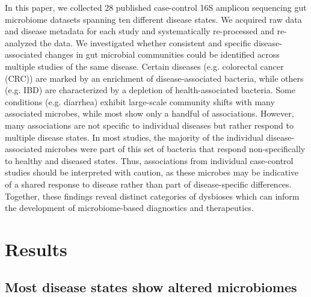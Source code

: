 In this paper, we collected 28 published case-control 16S amplicon sequencing gut microbiome datasets spanning ten different disease states.
We acquired raw data and disease metadata for each study and systematically re-processed and re-analyzed the data.
We investigated whether consistent and specific disease-associated changes in gut microbial communities could be identified across multiple studies of the same disease.
Certain diseases (e.g. colorectal cancer (CRC)) are marked by an enrichment of disease-associated bacteria, while others (e.g. IBD) are characterized by a depletion of health-associated bacteria.
Some conditions (e.g. diarrhea) exhibit large-scale community shifts with many associated microbes, while most show only a handful of associations.
However, many associations are not specific to individual diseases but rather respond to multiple disease states.
In most studies, the majority of the individual disease-associated microbes were part of this set of bacteria that respond non-specifically to healthy and diseased states.
Thus, associations from individual case-control studies should be interpreted with caution, as these microbes may be indicative of a shared response to disease rather than part of disease-specific differences.
Together, these findings reveal distinct categories of dysbioses which can inform the development of microbiome-based diagnostics and therapeutics.

\section*{Results}

\subsection*{Most disease states show altered microbiomes}

